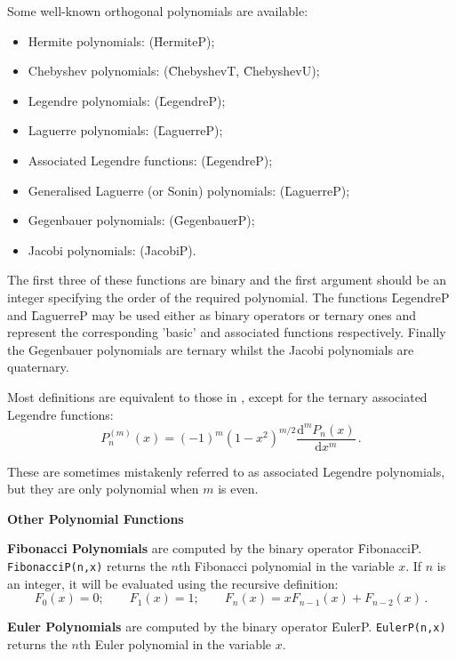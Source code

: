 Some well-known orthogonal polynomials are available:
\begin{itemize}
\item Hermite polynomials: (\f{HermiteP});
\item Chebyshev polynomials: (\f{ChebyshevT}, \f{ChebyshevU});
\item Legendre polynomials: (\f{LegendreP});
\item Laguerre polynomials: (\f{LaguerreP});
\item Associated Legendre functions: (\f{LegendreP});
\item Generalised Laguerre (or Sonin) polynomials: (\f{LaguerreP});
\item Gegenbauer polynomials: (\f{GegenbauerP});
\item Jacobi polynomials: (\f{JacobiP}).
\end{itemize}
The first three of these functions are binary and the first
argument should be an integer specifying the order of the
required polynomial. The functions \f{LegendreP} and \f{LaguerreP} may be used
either as binary operators or ternary ones and represent the corresponding
'basic' and associated functions respectively.
Finally the Gegenbauer polynomials are ternary whilst the Jacobi polynomials
are quaternary.

Most definitions are equivalent to those in \cite{AbramowitzStegun:72},
except for the ternary associated Legendre functions:
$$P_n^{(m)}(x) = (-1)^m(1-x^2)^{m/2}\frac{\mathrm{d}^m P_n(x)}{\mathrm{d}x^m}\,.$$

These are sometimes mistakenly referred to as associated Legendre polynomials,
but they are only polynomial when $m$ is even.

\textbf{Other Polynomial Functions}
\hypertarget{operator:FIBONACCIP}{}

\textbf{Fibonacci Polynomials} are computed by the binary operator 
\f{FibonacciP}.
\texttt{FibonacciP(n,x)} returns the $n$th Fibonacci polynomial
in the variable $x$. If $n$ is an integer, it will be
evaluated using the recursive definition:
$$F_0(x) = 0;\qquad F_1(x) = 1; \qquad F_n(x) = x F_{n-1}(x) + F_{n-2}(x)\,.$$

\textbf{Euler Polynomials} are computed by the binary operator 
\f{EulerP}.
\texttt{EulerP(n,x)} returns the $n$th Euler polynomial in the variable $x$.

